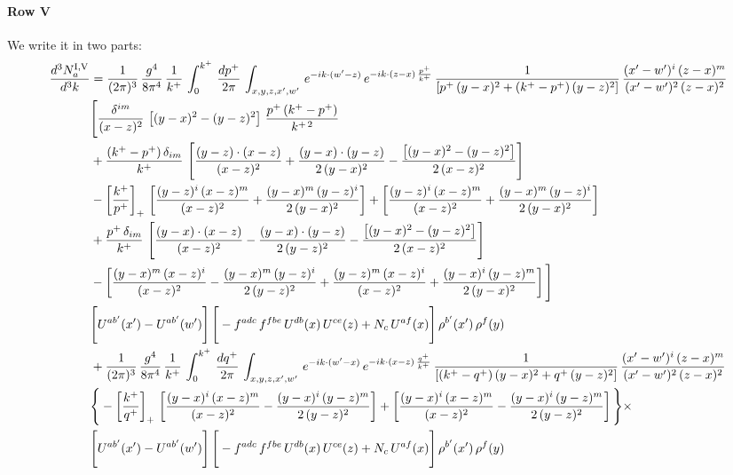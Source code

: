 \documentclass[9pt]{article}
\numberwithin{equation}{section}
\begin{document}
\paragraph{Row V}
We write it in two parts: 
\begin{align}
    \frac{d^{3}N^{\rm I,V}_{a}}{d^{3}k}  & =  \frac{1}{(2\pi)^{3}}\, \frac{g^{4}}{8\pi^{4}}\,\frac{1}{k^{+}}\,\int_{0}^{k^{+}}\, \frac{dp^{+}}{2\pi}\,\int_{x,y,z,x',w'}\, e^{-ik\cdot(w'-z)}\,e^{-ik\cdot (z-x)\,\frac{p^{+}}{k^{+}}}\,\frac{1}{\left[p^{+}\,(y-x)^{2}+(k^{+}-p^{+})\,(y-z)^{2}\right]}\, \frac{(x'-w')^{i}\,(z-x)^{m}}{(x'-w')^{2}\,(z-x)^{2}} \notag \\ & \Bigg[\frac{\delta^{im}}{(x-z)^{2}}\,\left[(y-x)^{2}-(y-z)^{2}\right]\,\frac{p^{+}\,(k^{+}-p^{+})}{k^{+\,2}}\notag \\ & +\frac{(k^{+}-p^{+})\,\delta_{im}}{k^{+}}\,\left[\frac{(y-z)\cdot (x-z)}{(x-z)^{2}}+\frac{(y-x)\cdot (y-z)}{2\,(y-x)^{2}}-\frac{\left[(y-x)^{2}-(y-z)^{2}\right]}{2\,(x-z)^{2}}\right]\notag \\ & -\left[\frac{k^{+}}{p^{+}}\right]_{+}\,\left[\frac{(y-z)^{i}\,(x-z)^{m}}{(x-z)^{2}}+\frac{(y-x)^{m}\,(y-z)^{i}}{2\,(y-x)^{2}}\right]+ \left[\frac{(y-z)^{i}\,(x-z)^{m}}{(x-z)^{2}}+\frac{(y-x)^{m}\,(y-z)^{i}}{2\,(y-x)^{2}}\right]\notag \\ & +\frac{p^{+}\,\delta_{im}}{k^{+}}\,\left[\frac{(y-x)\cdot (x-z)}{(x-z)^{2}}-\frac{(y-x)\cdot (y-z)}{2\,(y-z)^{2}}-\frac{\left[(y-x)^{2}-(y-z)^{2}\right]}{2\,(x-z)^{2}}\right]\notag \\ &-\left[\frac{(y-x)^{m}\,(x-z)^{i}}{(x-z)^{2}}-\frac{(y-x)^{m}\,(y-z)^{i}}{2\,(y-z)^{2}}+\frac{(y-z)^{m}\,(x-z)^{i}}{(x-z)^{2}}+\frac{(y-x)^{i}\,(y-z)^{m}}{2\,(y-x)^{2}}\right]\Bigg] \notag \\ & \Bigg[U^{ab'}(x')-U^{ab'}(w')\Bigg]\,\Bigg[-f^{adc}\,f^{fbe}\,U^{db}(x)\,U^{ce}(z)+N_{c}\,U^{af}(x)\Bigg]\,\rho^{b'}(x')\,\rho^{f}(y)\notag \\ & + \frac{1}{(2\pi)^{3}}\,\frac{g^{4}}{8\pi^{4}}\,\frac{1}{k^{+}}\, \int_{0}^{k^{+}}\, \frac{dq^{+}}{2\pi} \,  \int_{x,y,z,x',w'}\,e^{-ik\cdot(w'-x)}\,e^{-ik\cdot (x-z)\,\frac{q^{+}}{k^{+}}}\,\frac{1}{\left[(k^{+}-q^{+})\,(y-x)^{2}+q^{+}\,(y-z)^{2}\right]}\, \frac{(x'-w')^{i}\,(z-x)^{m}}{(x'-w')^{2}\,(z-x)^{2}} \notag \\ &\Bigg\{-\left[\frac{k^{+}}{q^{+}}\right]_{+}\,\left[\frac{(y-x)^{i}\,(x-z)^{m}}{(x-z)^{2}}-\frac{(y-x)^{i}\,(y-z)^{m}}{2\,(y-z)^{2}}\right] +\left[\frac{(y-x)^{i}\,(x-z)^{m}}{(x-z)^{2}}-\frac{(y-x)^{i}\,(y-z)^{m}}{2\,(y-z)^{2}}\right]\Bigg\}\times\,\notag \\ & \Bigg[U^{ab'}(x')-U^{ab'}(w')\Bigg]\,\Bigg[-f^{adc}\,f^{fbe}\,U^{db}(x)\,U^{ce}(z)+N_{c}\,U^{af}(x)\Bigg]\,\rho^{b'}(x')\,\rho^{f}(y)
\end{align} 
\end{document}
